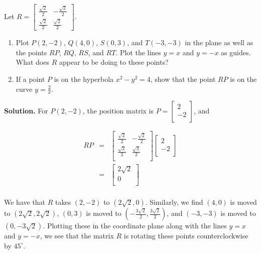 \begin{ex}  \label{rotationmatrixex} Let $R = \left[ \begin{array}{rr} \frac{\sqrt{2}}{2} & -\frac{\sqrt{2}}{2} \\ [3pt] \frac{\sqrt{2}}{2} & \frac{\sqrt{2}}{2} \end{array} \right]$.

\begin{enumerate}

\item Plot $P(2,-2)$, $Q(4,0)$, $S(0,3)$, and $T(-3,-3)$ in the plane as well as the points $RP$, $RQ$, $RS$, and $RT$. Plot the lines $y=x$ and $y=-x$ as guides.  What does $R$ appear to be doing to these points?

\item  If a point $P$ is on the hyperbola $x^2-y^2=4$, show that the point $RP$ is on the curve $y = \frac{2}{x}$.


\end{enumerate}

{\bf Solution.}  For $P(2,-2)$, the position matrix is  $P = \left[ \begin{array}{r} 2 \\ -2 \\ \end{array} \right]$, and 

\[\begin{array}{rcl}

RP & = &  \left[ \begin{array}{rr} \frac{\sqrt{2}}{2} & -\frac{\sqrt{2}}{2} \\ [3pt] \frac{\sqrt{2}}{2} & \frac{\sqrt{2}}{2} \\ \end{array} \right]\left[ \begin{array}{r} 2 \\ [3pt] -2 \\ \end{array} \right] \\ [13pt]

& = & \left[ \begin{array}{r} 2\sqrt{2} \\ 0 \\ \end{array} \right] \\

\end{array}\]

We have that $R$ takes $(2,-2)$ to $(2 \sqrt{2}, 0)$.  Similarly, we find $(4,0)$ is moved to $(2\sqrt{2}, 2\sqrt{2})$, $(0,3)$ is moved to $\left(-\frac{3 \sqrt{2}}{2},  \frac{3 \sqrt{2}}{2} \right)$, and $(-3,-3)$ is moved to $(0,-3\sqrt{2})$.  Plotting these in the coordinate plane along with the lines $y=x$ and $y=-x$, we see that the matrix $R$ is rotating these points counterclockwise by $45^{\circ}$.


\end{ex}

